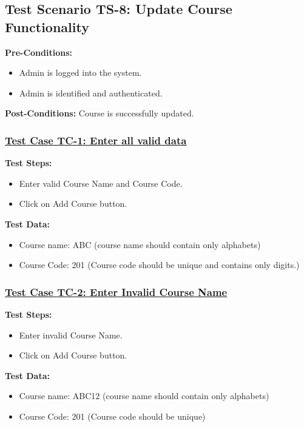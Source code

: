 \subsection{Test Scenario TS-8: Update Course Functionality}
\textbf{Pre-Conditions: } 
\begin{itemize}

\item Admin is logged into the system.
\item Admin is identified and authenticated.

\end{itemize}

\textbf{Post-Conditions: } Course is successfully updated.
\subsubsection{\underline{Test Case TC-1: Enter all valid data}}
\textbf{Test Steps:}
\begin{itemize}

\item Enter valid Course Name and Course Code.
\item Click on Add Course button.

\end{itemize}

\textbf{Test Data:}
\begin{itemize}

\item Course name: ABC (course name should contain only alphabets)
\item Course Code: 201 (Course code should be unique and contains only digits.)

\end{itemize}

\subsubsection{\underline{Test Case TC-2: Enter Invalid Course Name}}
\textbf{Test Steps:}
\begin{itemize}

\item Enter invalid Course Name.
\item Click on Add Course button.

\end{itemize}

\textbf{Test Data:}
\begin{itemize}

\item Course name: ABC12 (course name should contain only alphabets)
\item Course Code: 201 (Course code should be unique)

\end{itemize}

